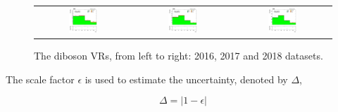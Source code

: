 \begin{figure}[tbh!]
 \begin{center}
 \begin{tabular}{ccc}
  \includegraphics[width=0.325\textwidth]{figures/Part3/Systematics/njet_2016}&
    \includegraphics[width=0.325\textwidth]{figures/Part3/Systematics/njet_2017}&
  \includegraphics[width=0.325\textwidth]{figures/Part3/Systematics/njet_2018}\\
 \end{tabular}
 \caption{The diboson \acp{VR}, from left to right: 2016, 2017 and 2018 datasets.}
 \label{fig:VV_CR}
 \end{center}
\end{figure}

The scale factor $\epsilon$ is used to estimate the uncertainty, denoted by $\Delta$,

\begin{equation}
\Delta=|1-\epsilon|
\end{equation}

